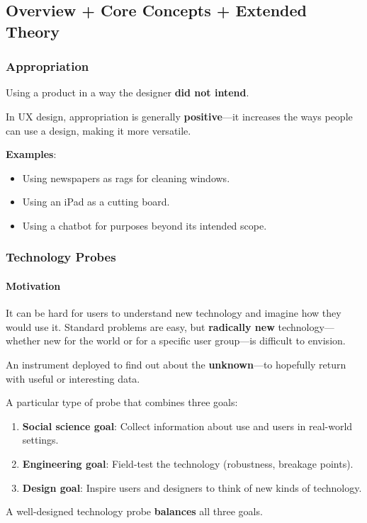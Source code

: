 \subsection{Overview + Core Concepts + Extended Theory}

\subsubsection*{Appropriation}

\begin{defbox}[Appropriation]
Using a product in a way the designer \textbf{did not intend}.

In UX design, appropriation is generally \textbf{positive}---it increases the ways people can use a design, making it more versatile.
\end{defbox}

\textbf{Examples}:
\begin{itemize}
  \item Using newspapers as rags for cleaning windows.
  \item Using an iPad as a cutting board.
  \item Using a chatbot for purposes beyond its intended scope.
\end{itemize}

\subsubsection*{Technology Probes}

\paragraph*{Motivation}
It can be hard for users to understand new technology and imagine how they would use it. Standard problems are easy, but \textbf{radically new} technology---whether new for the world or for a specific user group---is difficult to envision.

\begin{defbox}[Probe]
An instrument deployed to find out about the \textbf{unknown}---to hopefully return with useful or interesting data.
\end{defbox}

\begin{defbox}
A particular type of probe that combines three goals:
\begin{enumerate}
  \item \textbf{Social science goal}: Collect information about use and users in real-world settings.
  \item \textbf{Engineering goal}: Field-test the technology (robustness, breakage points).
  \item \textbf{Design goal}: Inspire users and designers to think of new kinds of technology.
\end{enumerate}

A well-designed technology probe \textbf{balances} all three goals.
\end{defbox}

